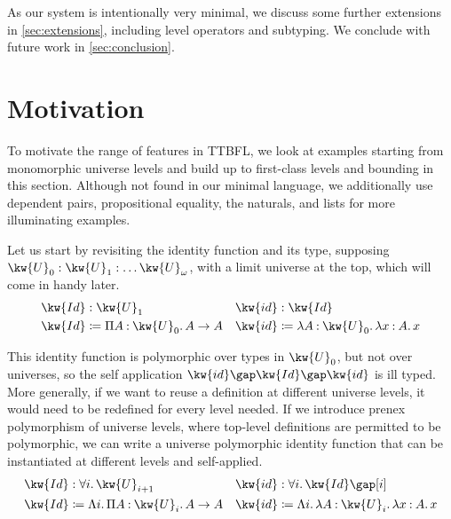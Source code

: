 \documentclass[a4paper,UKenglish,cleveref,autoref,thm-restate]{lipics-v2021}
\makeatletter
\newcommand{\lang}{TTBFL\@\xspace}
\makeatother
\begin{document}
As our system is intentionally very minimal,
we discuss some further extensions in \cref{sec:extensions},
including level operators and subtyping.
We conclude with future work in \cref{sec:conclusion}.

\section{Motivation}

To motivate the range of features in \lang,
we look at examples starting from monomorphic universe levels
and build up to first-class levels and bounding in this section.
Although not found in our minimal language,
we additionally use dependent pairs, propositional equality, the naturals, and lists
for more illuminating examples.

Let us start by revisiting the identity function and its type,
supposing $ \kw{U}_{  0  }  :  \kw{U}_{  1  }  : \dots  \kw{U}_{  \omega  } $,
with a limit universe at the top,
which will come in handy later.
%
\begin{align*}
   \kw{ Id }  &:  \kw{U}_{  1  } 
  & \kw{ id }  &:  \kw{ Id }  \\
   \kw{ Id }  &\coloneqq   \Pi  A  \mathbin{:}   \kw{U}_{  0  }   \mathpunct{.}  A   \to  A 
  &  \kw{ id }  &\coloneqq  \lambda  A  \mathbin{:}   \kw{U}_{  0  }   \mathpunct{.}   \lambda  x  \mathbin{:}  A  \mathpunct{.}  x  
\end{align*}

This identity function is polymorphic over types in $ \kw{U}_{  0  } $,
but not over universes, so the self application
$   \kw{ id }   \gap   \kw{ Id }    \gap   \kw{ id }  $ is ill typed.
More generally, if we want to reuse a definition at different universe levels,
it would need to be redefined for every level needed.
If we introduce prenex polymorphism of universe levels,
where top-level definitions are permitted to be polymorphic,
we can write a universe polymorphic identity function
that can be instantiated at different levels and self-applied.
%
\begin{align*}
   \kw{ Id }  &:  \forall  i  \mathpunct{.}   \kw{U}_{   i  + 1   }  
  & \kw{ id }  &:   \forall  i  \mathpunct{.}   \kw{ Id }    \gap [  i  ]  \\
   \kw{ Id }  &\coloneqq   \Lambda  i  \mathpunct{.}   \Pi  A  \mathbin{:}   \kw{U}_{ i }   \mathpunct{.}  A    \to  A 
  & \kw{ id }  &\coloneqq  \Lambda  i  \mathpunct{.}   \lambda  A  \mathbin{:}   \kw{U}_{ i }   \mathpunct{.}   \lambda  x  \mathbin{:}  A  \mathpunct{.}  x   
\end{align*}
\end{document}
